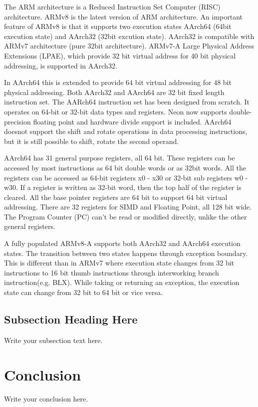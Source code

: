 \documentclass[journal]{IEEEtran}
\begin{document}
The ARM architecture is a Reduced Instruction Set Computer (RISC) architecture. ARMv8 is the latest version of ARM architecture.  An important feature of ARMv8 is that it supports two execution states AArch64 (64bit execution state) and AArch32 (32bit excution state).  AArch32 is compatible with ARMv7 architecture (pure 32bit architecture).  ARMv7-A Large Physical Address Extensions (LPAE), which provide 32 bit virtual address for 40 bit physical addressing, is supported in AArch32.

In AArch64 this is extended to provide 64 bit virtual addressing for 48 bit physical addressing.  Both AArch32 and AArch64 are 32 bit fixed length instruction set.  The AARch64 instruction set has been designed from scratch.  It operates on 64-bit or 32-bit data types and registers.  Neon now supports double-precision floating point and hardware divide support is included.  AArch64 doesnot support the shift and rotate operations in data processing instructions,  but it is still possible to shift, rotate the second operand.

AArch64 has 31 general purpose registers, all 64 bit.  These registers can be accessed by most instructions as 64 bit double words or as 32bit words.  All the registers can be accessed as 64-bit registers x0 - x30 or 32-bit sub registers w0 - w30.  If a register is written as 32-bit word, then the top half of the register is cleared.  All the base pointer registers are 64 bit to support 64 bit virtual addressing.  There are 32 registers for SIMD and Floating Point, all 128 bit wide.  The Program Counter (PC) can't be read or modified directly, unlike the other general registers.  

A fully populated ARMv8-A supports both AArch32 and AArch64 execution states. The transition between two states happens through exception boundary.  This is different than in ARMv7 where execution state changes from 32 bit instructions to 16 bit thumb instructions through interworking branch instruction(e.g. BLX). While taking or returning an exception, the execution state can change from 32 bit to 64 bit or vice versa.

\subsection{Subsection Heading Here}
Write your subsection text here.

\section{Conclusion}
Write your conclusion here.
\end{document}
